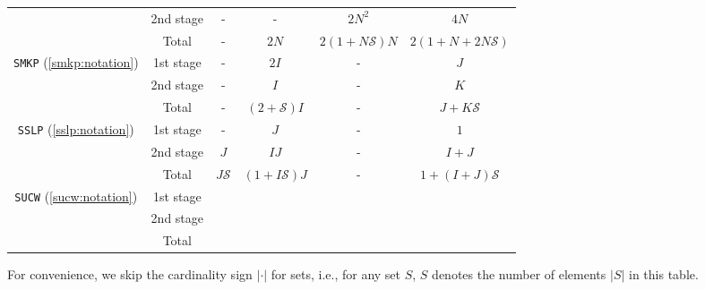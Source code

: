 \begin{table}[H]
{\begin{threeparttable}
\begin{tabular}{@{}cccccc@{}}
				& 2nd stage & -              & -                                  & $2N^2 $              & $4N$                     \\ \cmidrule(l){2-6} 
				& Total          & -              & $2N$                               & $2(1+N\mathcal{S})N$ & $2(1+N+2N\mathcal{S})$    \\ \midrule
				\multirow{3}{*}{\texttt{SMKP} (\ref{smkp:notation})}   & 1st stage & -              & $2I$                               & -                    & $J$                       \\
				& 2nd stage & -              & $I$                                & -                    & $K$                       \\ \cmidrule(l){2-6} 
				& Total          & -              & $(2+\mathcal{S})I$                 & -                    & $J+K\mathcal{S}$          \\ \midrule
				\multirow{3}{*}{\texttt{SSLP} (\ref{sslp:notation})}   & 1st stage & -              & $J$                                & -                    & $1$                       \\
				& 2nd stage & $J$            & $IJ$                               & -                    & $I+J$                     \\ \cmidrule(l){2-6} 
				& Total          & $J\mathcal{S}$ & $(1+I\mathcal{S})J$                & -                    & $1+(I+J)\mathcal{S}$      \\ \midrule
				\multirow{3}{*}{\texttt{SUCW} (\ref{sucw:notation})}   & 1st stage &                &                                    &                      &                           \\
				& 2nd stage &                &                                    &                      &                           \\ \cmidrule(l){2-6} 
				& Total          &                &                                    &                      &                           \\ \bottomrule
			\end{tabular}
	
			\begin{tablenotes}
				\small
				\item For convenience, we skip the cardinality sign $|\cdot|$ for sets, i.e., for any set $S$, $S$ denotes the number of elements $|S|$ in this table.
			\end{tablenotes}
		\end{threeparttable}
	}
\end{table}
